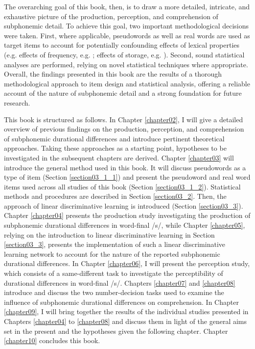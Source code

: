 \largerpage
The overarching goal of this book, then, is to draw a more detailed, intricate, and exhaustive picture of the production, perception, and comprehension of subphonemic detail. To achieve this goal, two important methodological decisions were taken. First, where applicable, pseudowords as well as real words are used as target items to account for potentially confounding effects of lexical properties (e.g. effects of frequency, e.g. \cite{Gahl2008, Lohmann2018}; effects of storage, e.g. \cite{Caselli2016}). Second, sound statistical analyses are performed, relying on novel statistical techniques where appropriate. Overall, the findings presented in this book are the results of a thorough methodological approach to item design and statistical analysis, offering a reliable account of the nature of subphonemic detail and a strong foundation for future research.

This book is structured as follows. In Chapter \ref{chapter02}, I will give a detailed overview of previous findings on the production, perception, and comprehension of subphonemic durational differences and introduce pertinent theoretical approaches. Taking these approaches as a starting point, hypotheses to be investigated in the subsequent chapters are derived. Chapter \ref{chapter03} will introduce the general method used in this book. It will discuss pseudowords as a type of item (Section \ref{section03_1_1}) and present the pseudoword and real word items used across all studies of this book (Section \ref{section03_1_2}). Statistical methods and procedures are described in Section \ref{section03_2}. Then, the approach of linear discriminative learning is introduced (Section \ref{section03_3}). Chapter \ref{chapter04} presents the production study investigating the production of subphonemic durational differences in word-final /s/, while Chapter \ref{chapter05}, relying on the introduction to linear discriminative learning in Section \ref{section03_3}, presents the implementation of such a linear discriminative learning network to account for the nature of the reported subphonemic durational differences. In Chapter \ref{chapter06}, I will present the perception study, which consists of a same-different task to investigate the perceptibility of durational differences in word-final /s/. Chapters \ref{chapter07} and \ref{chapter08} introduce and discuss the two number-decision tasks used to examine the influence of subphonemic durational differences on comprehension. In Chapter \ref{chapter09}, I will bring together the results of the individual studies presented in Chapters \ref{chapter04} to \ref{chapter08} and discuss them in light of the general aims set in the present and the hypotheses given the following chapter. Chapter \ref{chapter10} concludes this book.
